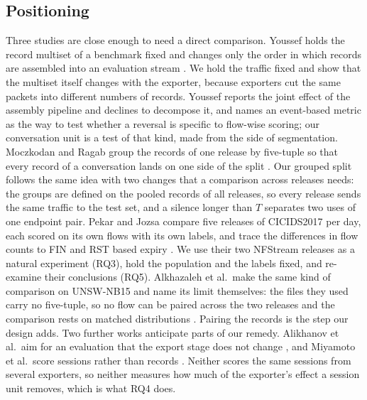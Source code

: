 \documentclass[pdflatex,sn-mathphys-num]{sn-jnl}
\newcommand{\cicids}{CICIDS2017}
\theoremstyle{thmstyleone}%
\theoremstyle{thmstylethree}%
\begin{document}
\subsection{Positioning}

Three studies are close enough to need a direct comparison. Youssef holds the record multiset of a benchmark fixed and changes only the order in which records are assembled into an evaluation stream \cite{youssef2026}. We hold the traffic fixed and show that the multiset itself changes with the exporter, because exporters cut the same packets into different numbers of records. Youssef reports the joint effect of the assembly pipeline and declines to decompose it, and names an event-based metric as the way to test whether a reversal is specific to flow-wise scoring; our conversation unit is a test of that kind, made from the side of segmentation. Moczkodan and Ragab group the records of one release by five-tuple so that every record of a conversation lands on one side of the split \cite{moczkodan2026}. Our grouped split follows the same idea with two changes that a comparison across releases needs: the groups are defined on the pooled records of all releases, so every release sends the same traffic to the test set, and a silence longer than $T$ separates two uses of one endpoint pair. Pekar and Jozsa compare five releases of \cicids{} per day, each scored on its own flows with its own labels, and trace the differences in flow counts to FIN and RST based expiry \cite{pekar2024}. We use their two NFStream releases as a natural experiment (RQ3), hold the population and the labels fixed, and re-examine their conclusions (RQ5). Alkhazaleh et al.\ make the same kind of comparison on UNSW-NB15 and name its limit themselves: the files they used carry no five-tuple, so no flow can be paired across the two releases and the comparison rests on matched distributions \cite{alkhazaleh2026}. Pairing the records is the step our design adds. Two further works anticipate parts of our remedy. Alikhanov et al.\ aim for an evaluation that the export stage does not change \cite{alikhanov2022}, and Miyamoto et al.\ score sessions rather than records \cite{miyamoto2023}. Neither scores the same sessions from several exporters, so neither measures how much of the exporter's effect a session unit removes, which is what RQ4 does.
\end{document}
